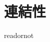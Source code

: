 \documentclass{jsarticle}
\begin{document}
\fi

\section{連結性}

\expandafter\ifx\csname readornot\endcsname\relax
  
\end{document}
